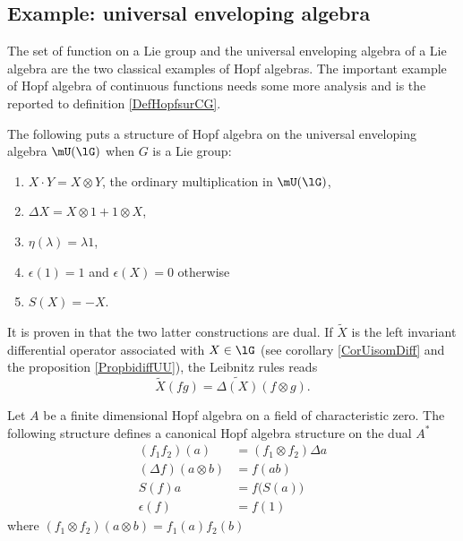 \subsection{Example: universal enveloping algebra}
The set of function on a Lie group and the universal enveloping algebra of a Lie algebra are the two classical examples of Hopf algebras.  The important example of Hopf algebra of continuous functions needs some more analysis and is the reported to definition \ref{DefHopfsurCG}.

The following puts a structure of Hopf algebra on the universal enveloping algebra $\mU(\lG)$ when $G$ is a Lie group:
\begin{enumerate}

	\item
		$X\cdot Y=X\otimes Y$, the ordinary multiplication in $\mU(\lG)$,
	\item
		$\Delta X=X\otimes 1+1\otimes X$,
	\item
		$\eta(\lambda)=\lambda 1$,
	\item	\label{ItemCounitUg}
		$\epsilon(1)=1$ and $\epsilon(X)=0$ otherwise
	\item
		$S(X)=-X$.

\end{enumerate}
It is proven in \cite{Tjin} that the two latter constructions are dual. If $\tilde X$ is the left invariant differential operator associated with $X\in\lG$ (see corollary \ref{CorUisomDiff} and the proposition \ref{PropbidiffUU}), the Leibnitz rules reads
\begin{equation}		\label{EqXfgDeltaUnif}
	\tilde X(fg)=\widetilde{\Delta(X)}(f\otimes g).
\end{equation}


\begin{proposition}     \label{PropHopfSurDual}
    Let \( A\) be a finite dimensional Hopf algebra on a field of characteristic zero. The following structure defines a canonical Hopf algebra structure on the dual \( A^*\)
    \begin{subequations}
        \begin{align}
            (f_1f_2)(a)&=(f_1\otimes f_2)\Delta a\\
            (\Delta f)(a\otimes b)&=f(ab)       \label{DefHopfSurAstar}\\
            S(f)a&=f\big( S(a) \big)\\
            \epsilon(f)&=f(1)
        \end{align}
    \end{subequations}
    where \( (f_1\otimes f_2)(a\otimes b)=f_1(a)f_2(b)\) 
\end{proposition}

